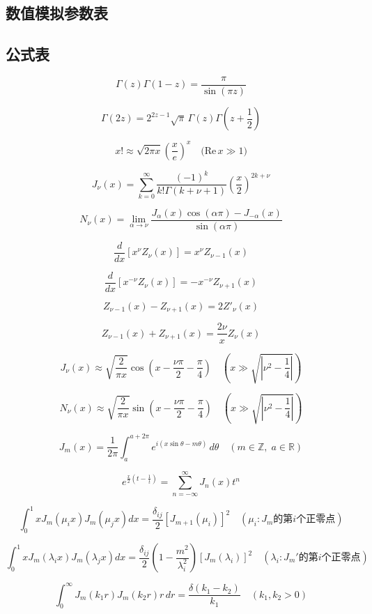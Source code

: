 \subsection{数值模拟参数表}
\subsection{公式表}
\[
\Gamma(z)\Gamma(1 - z) = \frac{\pi}{\sin(\pi z)}
\]

\[
\Gamma(2z) = 2^{2z - 1} \sqrt{\pi} \, \Gamma(z) \Gamma\left(z + \frac{1}{2}\right)
\]

\[
x! \approx \sqrt{2\pi x} \left( \frac{x}{e} \right)^x \quad \text{(Re}\, x \gg 1)
\]

\[
J_\nu(x) = \sum_{k=0}^{\infty} \frac{(-1)^k}{k! \Gamma(k + \nu + 1)} \left( \frac{x}{2} \right)^{2k + \nu}
\]

\[
N_\nu(x) = \lim_{\alpha \to \nu} \frac{J_\alpha(x) \cos(\alpha\pi) - J_{-\alpha}(x)}{\sin(\alpha \pi)}
\]

\[
\frac{d}{dx} \left[ x^\nu Z_\nu(x) \right] = x^\nu Z_{\nu - 1}(x)
\]

\[
\frac{d}{dx} \left[ x^{-\nu} Z_\nu(x) \right] = -x^{-\nu} Z_{\nu + 1}(x)
\]

\[
Z_{\nu - 1}(x) - Z_{\nu + 1}(x) = 2 Z'_\nu(x)
\]

\[
Z_{\nu - 1}(x) + Z_{\nu + 1}(x) = \frac{2\nu}{x} Z_\nu(x)
\]

\[
J_\nu(x) \approx \sqrt{\frac{2}{\pi x}} \cos\left( x - \frac{\nu\pi}{2} - \frac{\pi}{4} \right)
\quad (x \gg \sqrt{|\nu^2 - \frac{1}{4}|})
\]

\[
N_\nu(x) \approx \sqrt{\frac{2}{\pi x}} \sin\left( x - \frac{\nu\pi}{2} - \frac{\pi}{4} \right)
\quad (x \gg \sqrt{|\nu^2 - \frac{1}{4}|})
\]

\[
J_m(x) = \frac{1}{2\pi} \int_a^{a+2\pi} e^{i(x \sin \theta - m \theta)}\, d\theta
\quad (m \in \mathbb{Z},\; a \in \mathbb{R})
\]

\[
e^{\frac{x}{2} \left(t - \frac{1}{t}\right)} = \sum_{n=-\infty}^{\infty} J_n(x) t^n
\]

\[
\int_0^1 x J_m(\mu_i x) J_m(\mu_j x) dx = 
\frac{\delta_{ij}}{2} [J_{m+1}(\mu_i)]^2
\quad (\mu_i: J_m \text{的第}i\text{个正零点})
\]

\[
\int_0^1 x J_m(\lambda_i x) J_m(\lambda_j x) dx = 
\frac{\delta_{ij}}{2} \left(1 - \frac{m^2}{\lambda_i^2}\right) [J_m(\lambda_i)]^2
\quad (\lambda_i: J_m' \text{的第}i\text{个正零点})
\]

\[
\int_0^\infty J_m(k_1 r) J_m(k_2 r) r\,dr = \frac{\delta(k_1 - k_2)}{k_1}
\quad (k_1, k_2 > 0)
\]

